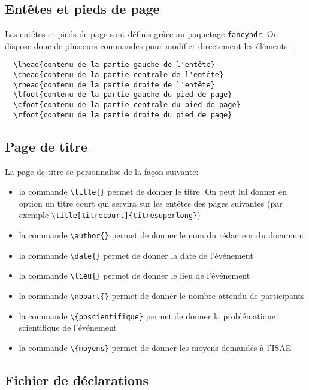 \documentclass[fr]{supaero-orga}
\begin{document}
\subsection{Entêtes et pieds de page}
\label{sec:entetes-et-pieds}

Les entêtes et pieds de page sont définis grâce au paquetage
\texttt{fancyhdr}. On dispose donc de plusieurs commandes pour
modifier directement les éléments~:

\begin{verbatim}
  \lhead{contenu de la partie gauche de l'entête}
  \chead{contenu de la partie centrale de l'entête}
  \rhead{contenu de la partie droite de l'entête}
  \lfoot{contenu de la partie gauche du pied de page}
  \cfoot{contenu de la partie centrale du pied de page}
  \rfoot{contenu de la partie droite du pied de page}
\end{verbatim}

\subsection{Page de titre}
\label{sec:page-de-titre}

La page de titre se personnalise de la façon suivante:

\begin{itemize}
\item la commande \verb!\title{}! permet de donner le titre. On peut
  lui donner en option un titre court qui servira sur les entêtes des
  pages suivantes (par exemple
  \verb!\title[titrecourt]{titresuperlong}!)
\item la commande \verb!\author{}! permet de donner le nom du
  rédacteur du document
\item la commande \verb!\date{}! permet de donner la date de
  l'événement
\item la commande \verb!\lieu{}! permet de donner le lieu de
l'événement
\item la commande \verb!\nbpart{}! permet de donner le nombre attendu
  de participants
\item la commande \verb!\{pbscientifique}! permet de donner la
problématique scientifique de l'événement
\item la commande \verb!\{moyens}! permet de donner les moyens
demandés à l'ISAE
\end{itemize}

\subsection{Fichier de déclarations}
\label{sec:fich-de-decl}
\end{document}
